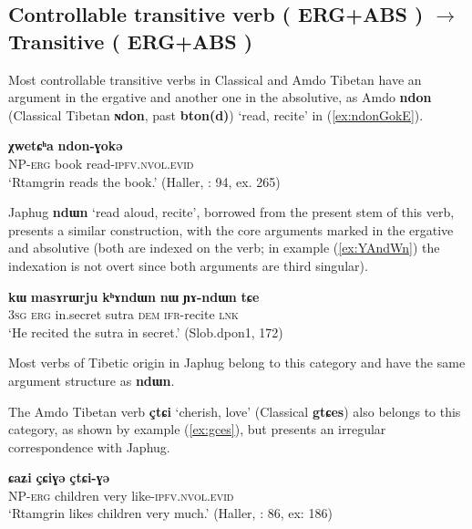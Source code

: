 \documentclass[oneside,a4paper,11pt]{article}
\makeatletter
\newcommand{\ipa}[1]{{\phon\textbf{\mbox{#1}}}} %
\newcommand{\refb}[1]{(\ref{#1})}
\def\fakesc#1{%
  \begingroup%
  \xdef\fake@name{\csname\curr@fontshape/\f@size\endcsname}%
  \fontsize{\fontdimen8\fake@name}{\baselineskip}\selectfont%
  \uppercase{#1}%
  \endgroup%
}
\makeatother
\begin{document}
\subsection{Controllable transitive verb (\fakesc{erg+abs})  $\rightarrow$ Transitive (\fakesc{erg+abs})}
Most controllable transitive verbs in Classical and Amdo Tibetan have an argument in the ergative and another one in the absolutive, as Amdo \ipa{ndon} (Classical Tibetan \ipa{ɴdon}, past \ipa{bton(d)}) `read, recite' in \refb{ex:ndonGokE}.


\begin{exe}
\ex \label{ex:ndonGokE}
\gll \ipa{ʂtamɖʐən-ɣə}  \ipa{χwetɕʰa}  \ipa{ndon-ɣokə} \\
NP-\textsc{erg} book read-\textsc{ipfv.nvol.evid} \\
\glt `Rtamgrin reads the book.' (Haller, \citeyear{haller04themchen}: 94, ex. 265)
\end{exe}


Japhug \ipa{ndɯn} `read aloud, recite', borrowed from the present stem of this verb, presents a similar construction, with the core arguments marked in the ergative and absolutive (both are indexed on the verb; in example \refb{ex:YAndWn} the indexation is not overt since both arguments are third singular).

\begin{exe}
\ex \label{ex:YAndWn}
\gll \ipa{ɯʑo} 	\ipa{kɯ} 	\ipa{masɤrɯrju} 	\ipa{kʰɤndɯn} 	\ipa{nɯ} 	\ipa{ɲɤ-ndɯn} 	\ipa{tɕe} \\
\textsc{3sg} \textsc{erg} in.secret sutra \textsc{dem} \textsc{ifr}-recite \textsc{lnk} \\
\glt `He recited the sutra in secret.' (Slob.dpon1, 172)
\end{exe}

Most verbs of Tibetic origin in Japhug belong to this category and have the same argument structure as \ipa{ndɯn}. 

The Amdo Tibetan verb \ipa{çtɕi} `cherish, love' (Classical \ipa{gtɕes}) also belongs to this category, as shown by example \refb{ex:gces}, but presents an irregular correspondence with Japhug.

\begin{exe}
\ex \label{ex:gces}
\gll \ipa{ʂtamɖʐən-ɣə}  \ipa{ɕaʑi} \ipa{çɕiɣə}  \ipa{çtɕi-ɣə} \\
NP-\textsc{erg} children very like-\textsc{ipfv.nvol.evid} \\
\glt `Rtamgrin likes children very much.' (Haller, \citeyear{haller04themchen}: 86, ex: 186)
\end{exe}
\end{document}
